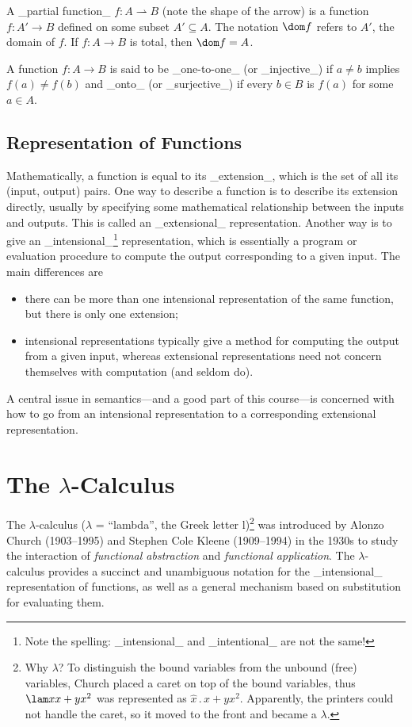 A _partial function_ $f: A\rightharpoonup B$ (note the shape of the arrow) is a function $f:A'\to B$ defined on some subset $A'\subseteq A$. The notation $\dom f$ refers to $A'$, the domain of $f$. If $f:A\to B$ is total, then $\dom f = A$.

A function $f:A\rightarrow B$ is said to be _one-to-one_ (or _injective_) if $a\neq b$ implies $f(a)\neq f(b)$ and _onto_ (or _surjective_) if every $b\in B$ is $f(a)$ for some $a\in A$.

\subsection{Representation of Functions}

Mathematically, a function is equal to its _extension_, which is the set of all its (input, output) pairs. One way to describe a function is to describe its extension directly, usually by specifying some mathematical relationship between the inputs and outputs. This is called an _extensional_ representation. Another way is to give an
_intensional_\footnote{Note the spelling: _intensional_ and _intentional_ are not the same!}
representation, which is essentially a program or evaluation procedure to compute the output corresponding to a given input. The main differences are
\begin{itemize}
\item
there can be more than one intensional representation of the same function, but there is only one extension;
\item
intensional representations typically give a method for computing the output from a given input, whereas extensional representations need not concern themselves with computation (and seldom do).
\end{itemize}

A central issue in semantics---and a good part of this course---is concerned with how to go from an intensional representation to a corresponding extensional representation.

\section{The $\lambda$-Calculus}

The $\lambda$-calculus ($\lambda$ = ``lambda'', the Greek letter l)\footnote{Why $\lambda$? To distinguish the bound
variables from the unbound (free) variables, Church placed a caret on top of
the bound variables, thus $\lam x{x + yx^2}$ was represented as
$\hat x\,.\,x + yx^2$. Apparently, the printers could not handle the caret,
so it moved to the front and became a $\lambda$.}
was introduced by Alonzo Church (1903--1995) and Stephen Cole Kleene (1909--1994) in the 1930s to study
the interaction of \emph{functional abstraction} and \emph{functional application}.
The $\lambda$-calculus provides a succinct and unambiguous notation
for the _intensional_ representation of functions, as well as a
general mechanism based on substitution for evaluating them.

